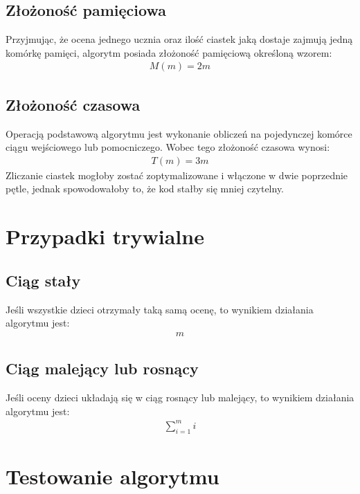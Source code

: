 \documentclass{article}
\begin{document}
	\subsection{Złożoność pamięciowa}
	Przyjmując, że ocena jednego ucznia oraz ilość ciastek jaką dostaje zajmują jedną komórkę pamięci, algorytm posiada złożoność pamięciową określoną wzorem:
	\begin{align*}
		M(m) = 2m
	\end{align*}

	\subsection{Złożoność czasowa}
	Operacją podstawową algorytmu jest wykonanie obliczeń na pojedynczej komórce ciągu wejściowego lub pomocniczego. Wobec tego złożoność czasowa wynosi:
	\begin{align*}
		T(m) = 3m
	\end{align*}
	Zliczanie ciastek mogłoby zostać zoptymalizowane i włączone w dwie poprzednie pętle, jednak spowodowałoby to, że kod stałby się mniej czytelny.


	\section{Przypadki trywialne}

	\subsection{Ciąg stały}

	Jeśli wszystkie dzieci otrzymały taką samą ocenę, to wynikiem działania algorytmu jest:
	\begin{align*}
		m
	\end{align*}

	\subsection{Ciąg malejący lub rosnący}

	Jeśli oceny dzieci układają się w ciąg rosnący lub malejący, to wynikiem działania algorytmu jest:
	\begin{align*}
		\displaystyle\sum_{i=1}^{m} i
	\end{align*}

	\section{Testowanie algorytmu}
\end{document}

